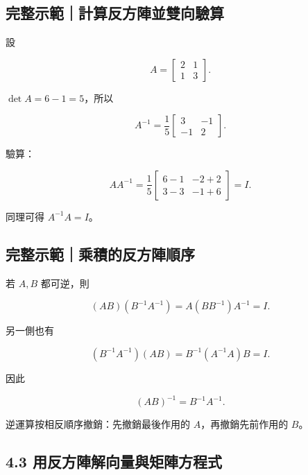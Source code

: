 \documentclass[11pt,a4paper]{article}
\begin{document}
\clearpage

\begin{HandoutWorkedExample}

\subsection{完整示範｜計算反方陣並雙向驗算}\label{ux5b8cux6574ux793aux7bc4ux8a08ux7b97ux53cdux65b9ux9663ux4e26ux96d9ux5411ux9a57ux7b97}

設

\[
A=\begin{bmatrix}2&1\\1&3\end{bmatrix}.
\]

\(\det A=6-1=5\)，所以

\[
A^{-1}=\frac15\begin{bmatrix}3&-1\\-1&2\end{bmatrix}.
\]

驗算：

\[
AA^{-1}
=\frac15
\begin{bmatrix}
6-1&-2+2\\
3-3&-1+6
\end{bmatrix}
=I.
\]

同理可得 \(A^{-1}A=I\)。

\end{HandoutWorkedExample}

\begin{HandoutWorkedExample}

\subsection{完整示範｜乘積的反方陣順序}\label{ux5b8cux6574ux793aux7bc4ux4e58ux7a4dux7684ux53cdux65b9ux9663ux9806ux5e8f}

若 \(A,B\) 都可逆，則

\[
(AB)(B^{-1}A^{-1})
=A(BB^{-1})A^{-1}
=I.
\]

另一側也有

\[
(B^{-1}A^{-1})(AB)
=B^{-1}(A^{-1}A)B
=I.
\]

因此

\[
\boxed{(AB)^{-1}=B^{-1}A^{-1}}.
\]

逆運算按相反順序撤銷：先撤銷最後作用的 \(A\)，再撤銷先前作用的 \(B\)。

\end{HandoutWorkedExample}

\subsection{4.3 用反方陣解向量與矩陣方程式}\label{ux7528ux53cdux65b9ux9663ux89e3ux5411ux91cfux8207ux77e9ux9663ux65b9ux7a0bux5f0f}
\end{document}

